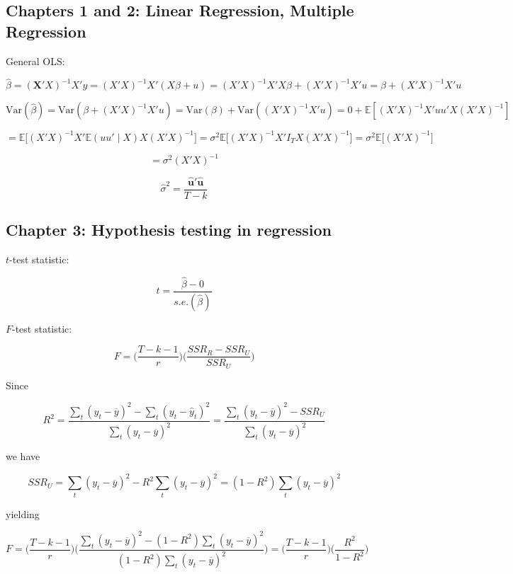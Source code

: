 \documentclass{article}
\newcommand{\E}{\mathbb{E}}
\newcommand{\Var}{\mathrm{Var}}
\begin{document}

\subsection{Chapters 1 and 2: Linear Regression, Multiple Regression}

General OLS:

\[
\hat{\beta} = (\boldsymbol{X}'X)^{-1}X'y = (X'X)^{-1}X'(X\beta + u) = (X'X)^{-1}X'X\beta + (X'X)^{-1}X'u  = \beta + (X'X)^{-1}X'u
\]

\[
\Var(\hat{\beta}) = \Var(\beta + (X'X)^{-1}X'u) = \Var(\beta) + \Var((X'X)^{-1}X' u) = 0 + \E[(X'X)^{-1}X' uu' X (X'X)^{-1} ] 
\]

\[
=\E \big[ (X'X)^{-1}X' \E(uu' \mid X)X(X'X)^{-1} \big] = \sigma^2 \E \big[ (X'X)^{-1}X' I_T X(X'X)^{-1} \big] = \sigma^2 \E \big[ (X'X)^{-1} \big]
\]

\[
= \sigma^2  (X'X)^{-1} 
\]

\[
\hat{\sigma}^2 = \frac{ \hat{\boldsymbol{u}}'  \hat{\boldsymbol{u}}}{T - k}
\]

\subsection{Chapter 3: Hypothesis testing in regression}

\(t\)-test statistic:

\[
t = \frac{\hat{\beta} - 0}{s.e.(\hat{\beta})}
\]

\(F\)-test statistic:

\[
F = \bigg( \frac{T - k - 1}{r}\bigg) \bigg( \frac{SSR_R - SSR_U} {SSR_U} \bigg)
\]

Since 

\[
R^2 = \frac{ \sum_t(y_t - \overline{y})^2 - \sum_t(y_t - \hat{y}_t)^2}{ \sum_t(y_t - \overline{y})^2} =  \frac{ \sum_t(y_t - \overline{y})^2 - SSR_U}{ \sum_t(y_t - \overline{y})^2} 
\]

we have

\[
SSR_U =  \sum_t(y_t - \overline{y})^2 - R^2  \sum_t(y_t - \overline{y})^2  =  (1 - R^2)\sum_t(y_t - \overline{y})^2
\]

yielding

\[
F = \bigg( \frac{T - k - 1}{r} \bigg) \bigg( \frac{\sum_t(y_t - \overline{y})^2 - (1 - R^2)\sum_t(y_t - \overline{y})^2}{(1 - R^2)\sum_t(y_t - \overline{y})^2} \bigg) = \bigg( \frac{T - k - 1}{r} \bigg) \bigg( \frac{R^2}{1 - R^2} \bigg)
\]
\end{document}
